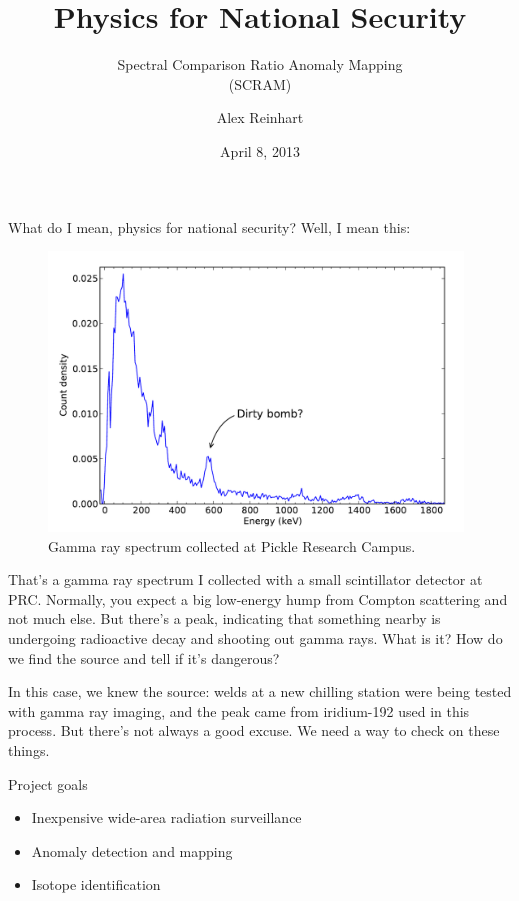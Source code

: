 \documentclass[ignorenonframetext]{beamer}
\title[Physics for National Security]{Physics for National Security}
\subtitle{Spectral Comparison Ratio Anomaly Mapping\\(SCRAM)}
\author{Alex Reinhart}
\institute{Applied Research Labs}
\date{April 8, 2013}
\begin{document}
\maketitle

\begin{frame}
\titlepage
\end{frame}

What do I mean, physics for national security? Well, I mean this:

\begin{frame}
  \begin{figure}
    \includegraphics[width=110mm]{figures/talk-bomb-spectrum.pdf}
    \caption{Gamma ray spectrum collected at Pickle Research Campus.}
  \end{figure}
\end{frame}

That's a gamma ray spectrum I collected with a small scintillator detector at
PRC. Normally, you expect a big low-energy hump from Compton scattering and not
much else. But there's a peak, indicating that something nearby is undergoing
radioactive decay and shooting out gamma rays. What is it? How do we find the
source and tell if it's dangerous?

In this case, we knew the source: welds at a new chilling station were being
tested with gamma ray imaging, and the peak came from iridium-192 used in this
process. But there's not always a good excuse. We need a way to check on these
things.

\begin{frame}{Project goals}
  \begin{itemize}
    \item Inexpensive wide-area radiation surveillance
    \item Anomaly detection and mapping
    \item Isotope identification
  \end{itemize}
\end{frame}
\end{document}
